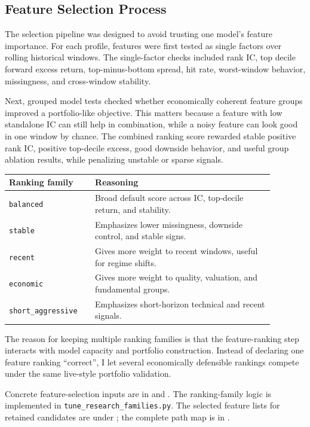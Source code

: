 \documentclass[11pt]{article}
\begin{document}
\subsection{Feature Selection Process}

The selection pipeline was designed to avoid trusting one model's feature
importance. For each profile, features were first tested as single factors over
rolling historical windows. The single-factor checks included rank IC, top
decile forward excess return, top-minus-bottom spread, hit rate, worst-window
behavior, missingness, and cross-window stability.

Next, grouped model tests checked whether economically coherent feature groups
improved a portfolio-like objective. This matters because a feature with low
standalone IC can still help in combination, while a noisy feature can look good
in one window by chance. The combined ranking score rewarded stable positive
rank IC, positive top-decile excess, good downside behavior, and useful group
ablation results, while penalizing unstable or sparse signals.

\begin{table}[h]
\centering
\begin{tabular}{p{0.28\linewidth}p{0.60\linewidth}}
\toprule
Ranking family & Reasoning \\
\midrule
\texttt{balanced} & Broad default score across IC, top-decile return, and stability. \\
\texttt{stable} & Emphasizes lower missingness, downside control, and stable signs. \\
\texttt{recent} & Gives more weight to recent windows, useful for regime shifts. \\
\texttt{economic} & Gives more weight to quality, valuation, and fundamental groups. \\
\texttt{short\_aggressive} & Emphasizes short-horizon technical and recent signals. \\
\bottomrule
\end{tabular}
\end{table}

The reason for keeping multiple ranking families is that the feature-ranking
step interacts with model capacity and portfolio construction. Instead of
declaring one feature ranking ``correct'', I let several economically defensible
rankings compete under the same live-style portfolio validation.

Concrete feature-selection inputs are in
 and
. The ranking-family logic is
implemented in \texttt{tune\_research\_families.py}. The selected feature lists
for retained candidates are under ; the
complete path map is in .
\end{document}
